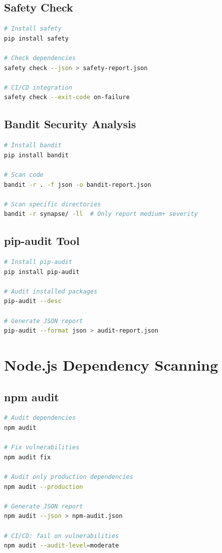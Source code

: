 \documentclass{report}
\begin{document}
\subsection{Safety Check}
\begin{lstlisting}[language=bash]
# Install safety
pip install safety

# Check dependencies
safety check --json > safety-report.json

# CI/CD integration
safety check --exit-code on-failure
\end{lstlisting}

\subsection{Bandit Security Analysis}
\begin{lstlisting}[language=bash]
# Install bandit
pip install bandit

# Scan code
bandit -r . -f json -o bandit-report.json

# Scan specific directories
bandit -r synapse/ -ll  # Only report medium+ severity
\end{lstlisting}

\subsection{pip-audit Tool}
\begin{lstlisting}[language=bash]
# Install pip-audit
pip install pip-audit

# Audit installed packages
pip-audit --desc

# Generate JSON report
pip-audit --format json > audit-report.json
\end{lstlisting}

\section{Node.js Dependency Scanning}

\subsection{npm audit}
\begin{lstlisting}[language=bash]
# Audit dependencies
npm audit

# Fix vulnerabilities
npm audit fix

# Audit only production dependencies
npm audit --production

# Generate JSON report
npm audit --json > npm-audit.json

# CI/CD: fail on vulnerabilities
npm audit --audit-level=moderate
\end{lstlisting}
\end{document}

